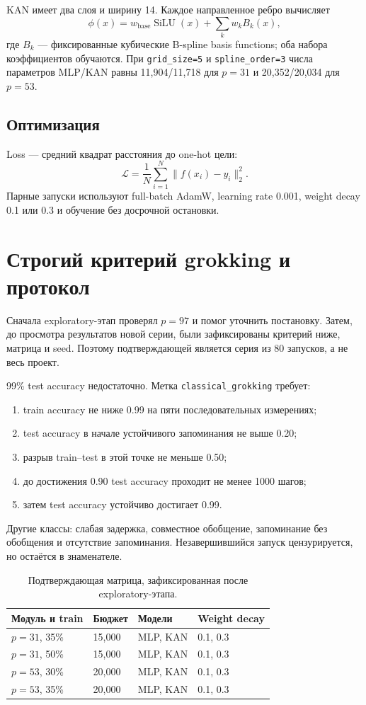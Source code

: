 \documentclass[11pt,a4paper]{article}
\begin{document}
KAN имеет два слоя и ширину 14. Каждое направленное ребро вычисляет
\[
\phi(x)=w_{\mathrm{base}}\operatorname{SiLU}(x)+
\sum_k w_k B_k(x),
\]
где $B_k$ --- фиксированные кубические B-spline basis functions; оба набора
коэффициентов обучаются. При \texttt{grid\_size=5} и
\texttt{spline\_order=3} числа параметров MLP/KAN равны 11,904/11,718 для
$p=31$ и 20,352/20,034 для $p=53$.

\subsection{Оптимизация}

Loss --- средний квадрат расстояния до one-hot цели:
\[
\mathcal L=\frac1N\sum_{i=1}^{N}\|f(x_i)-y_i\|_2^2.
\]
Парные запуски используют full-batch AdamW, learning rate 0.001, weight decay
0.1 или 0.3 и обучение без досрочной остановки.

\clearpage
\section{Строгий критерий grokking и протокол}

Сначала exploratory-этап проверял $p=97$ и помог уточнить постановку. Затем, до
просмотра результатов новой серии, были зафиксированы критерий ниже, матрица и
seed. Поэтому подтверждающей является серия из 80 запусков, а не весь проект.

99\% test accuracy недостаточно. Метка \texttt{classical\_grokking} требует:

\begin{enumerate}
  \item train accuracy не ниже 0.99 на пяти последовательных измерениях;
  \item test accuracy в начале устойчивого запоминания не выше 0.20;
  \item разрыв train--test в этой точке не меньше 0.50;
  \item до достижения 0.90 test accuracy проходит не менее 1000 шагов;
  \item затем test accuracy устойчиво достигает 0.99.
\end{enumerate}

Другие классы: слабая задержка, совместное обобщение, запоминание без обобщения
и отсутствие запоминания. Незавершившийся запуск цензурируется, но остаётся в
знаменателе.

\begin{table}[H]
\centering
\caption{Подтверждающая матрица, зафиксированная после exploratory-этапа.}
\begin{tabular}{@{}llll@{}}
\toprule
Модуль и train & Бюджет & Модели & Weight decay \\
\midrule
$p=31$, 35\% & 15,000 & MLP, KAN & 0.1, 0.3 \\
$p=31$, 50\% & 15,000 & MLP, KAN & 0.1, 0.3 \\
$p=53$, 30\% & 20,000 & MLP, KAN & 0.1, 0.3 \\
$p=53$, 35\% & 20,000 & MLP, KAN & 0.1, 0.3 \\
\bottomrule
\end{tabular}
\end{table}
\end{document}
